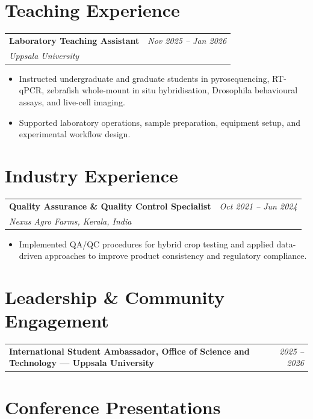 \documentclass[10pt, a4paper]{article}
\makeatletter
\newcommand{\entry}[3]{%
  \begin{tabularx}{\linewidth}{@{}X r@{}}
    \textbf{#1} & \textit{#3} \\
    \textit{#2} & \\
  \end{tabularx}%
}
\newcommand{\entryflat}[2]{%
  \begin{tabularx}{\linewidth}{@{}X r@{}}
    \textbf{#1} & \textit{#2} \\
  \end{tabularx}%
}
\makeatother
\begin{document}
\vspace{2pt}

\section{Teaching Experience}

\entry{Laboratory Teaching Assistant}{Uppsala University}{Nov 2025 -- Jan 2026}
\begin{itemize}
\item Instructed undergraduate and graduate students in pyrosequencing, RT-qPCR, zebrafish whole-mount in situ hybridisation, Drosophila behavioural assays, and live-cell imaging.
\item Supported laboratory operations, sample preparation, equipment setup, and experimental workflow design.
\end{itemize}

\vspace{2pt}

\section{Industry Experience}

\entry{Quality Assurance \& Quality Control Specialist}{Nexus Agro Farms, Kerala, India}{Oct 2021 -- Jun 2024}
\begin{itemize}
\item Implemented QA/QC procedures for hybrid crop testing and applied data-driven approaches to improve product consistency and regulatory compliance.
\end{itemize}

\vspace{2pt}

\section{Leadership \& Community Engagement}

\entryflat{International Student Ambassador, Office of Science and Technology --- Uppsala University}{2025 -- 2026}

\section{Conference Presentations}
\end{document}
